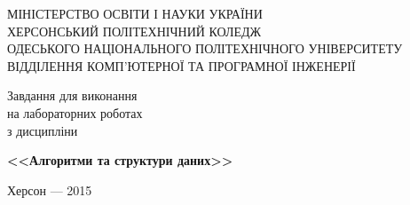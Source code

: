 \begin{titlepage}
\newpage

\begin{center}
МІНІСТЕРСТВО ОСВІТИ І НАУКИ УКРАЇНИ \\

ХЕРСОНСЬКИЙ ПОЛІТЕХНІЧНИЙ КОЛЕДЖ \\

ОДЕСЬКОГО НАЦІОНАЛЬНОГО ПОЛІТЕХНІЧНОГО УНІВЕРСИТЕТУ\\

ВІДДІЛЕННЯ КОМП'ЮТЕРНОЇ ТА ПРОГРАМНОЇ ІНЖЕНЕРІЇ

\end{center}


\vspace{10em}

\begin{center}
\Large Завдання для виконання \\ на лабораторних роботах \\ з дисципліни
\end{center}

\vspace{2em}

\begin{center}
\huge{\textbf{<<Алгоритми та структури даних>>}}
\end{center}




\vspace{\fill}

\begin{center}
Херсон --- 2015
\end{center}

\end{titlepage}






\tableofcontents


\listoffigures

\listoftables

\lstlistoflistings


